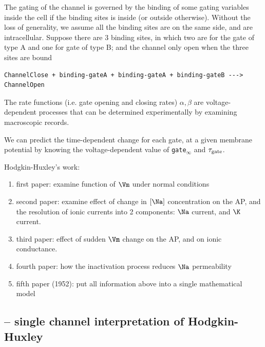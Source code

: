 \begin{mdframed}
The gating of the channel is governed by the binding of some gating variables
inside the cell if the binding sites is inside (or outside otherwise). Without
the loss of generality, we assume all the binding sites are on the same side,
and are intracellular.  Suppose there are 3 binding sites, in which two are
for the gate of type A and one for gate of type B; and the channel only open
when the three sites are bound

{\small
\begin{verbatim}
ChannelClose + binding-gateA + binding-gateA + binding-gateB ---> ChannelOpen
\end{verbatim}
}

\end{mdframed}

The rate functions (i.e. gate opening and closing rates) $\alpha, \beta$ are
voltage-dependent processes that can be determined experimentally by examining
macroscopic records.

We can predict the time-dependent change for each gate, at a given membrane
potential by knowing the voltage-dependent value of \verb!gate!$_\infty$ and
$\tau_{\text{gate}}$.


Hodgkin-Huxley's work:
\begin{enumerate}
  \item first paper: examine function of $\Vm$ under normal conditions

  \item second paper: examine effect of change in $[\Na]$ concentration on the
  AP, and the resolution of ionic currents into 2 components: $\Na $ current,
  and $\K$ current.

  \item third paper: effect of sudden $\Vm$ change on the AP, and on ionic
  conductance.

  \item fourth paper: how the inactivation process reduces $\Na$ permeability

  \item fifth paper (1952): put all information above into a single mathematical
  model
\end{enumerate}


\subsection{-- single channel interpretation of Hodgkin-Huxley}

